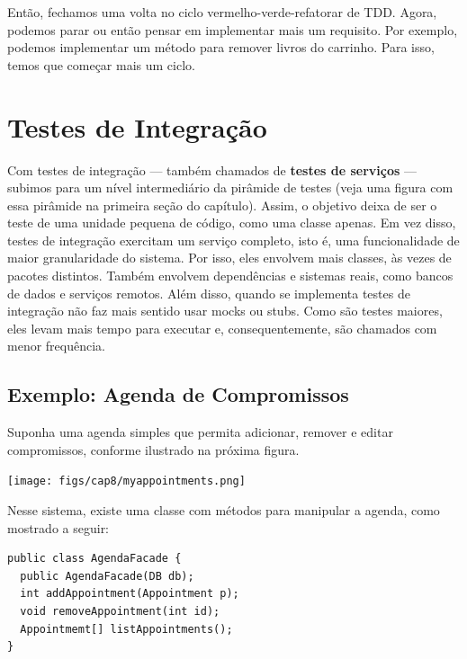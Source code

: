 \documentclass[
  11pt,
  twoside]{book}
\let\origfigure\figure
\let\endorigfigure\endfigure
\renewenvironment{figure}[1][2] {
    \expandafter\origfigure\expandafter[!h]
} {
    \endorigfigure
}
\begin{document}
Então, fechamos uma volta no ciclo vermelho-verde-refatorar de TDD.
Agora, podemos parar ou então pensar em implementar mais um requisito.
Por exemplo, podemos implementar um método para remover livros do
carrinho. Para isso, temos que começar mais um ciclo.

\hypertarget{testes-de-integrauxe7uxe3o}{%
\section{Testes de Integração}\label{testes-de-integrauxe7uxe3o}}


Com testes de integração --- também chamados de \textbf{testes de
serviços} --- subimos para um nível intermediário da pirâmide de testes
(veja uma figura com essa pirâmide na primeira seção do capítulo).
Assim, o objetivo deixa de ser o teste de uma unidade pequena de código,
como uma classe apenas. Em vez disso, testes de integração exercitam um
serviço completo, isto é, uma funcionalidade de maior granularidade do
sistema. Por isso, eles envolvem mais classes, às vezes de pacotes
distintos. Também envolvem dependências e sistemas reais, como bancos de
dados e serviços remotos. Além disso, quando se implementa testes de
integração não faz mais sentido usar mocks ou stubs. Como são testes
maiores, eles levam mais tempo para executar e, consequentemente, são
chamados com menor frequência.

\hypertarget{exemplo-agenda-de-compromissos}{%
\subsection{Exemplo: Agenda de
Compromissos}\label{exemplo-agenda-de-compromissos}}

Suponha uma agenda simples que permita adicionar, remover e editar
compromissos, conforme ilustrado na próxima figura.

\begin{figure}
\centering
\texttt{[image: figs/cap8/myappointments.png]}
\caption{Interface da Agenda de Compromissos}
\end{figure}

Nesse sistema, existe uma classe com métodos para manipular a agenda,
como mostrado a seguir:

\newpage

\begin{lstlisting}
public class AgendaFacade {
  public AgendaFacade(DB db);
  int addAppointment(Appointment p);
  void removeAppointment(int id);
  Appointmemt[] listAppointments();
}
\end{lstlisting}
\end{document}
